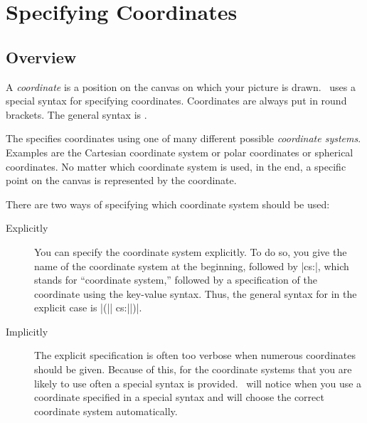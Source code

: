 %
%
%

\section{Specifying Coordinates}


\subsection{Overview}

A \emph{coordinate} is a position on the canvas on which your picture
is drawn. \tikzname\ uses a special syntax for specifying
coordinates. Coordinates are always put in round brackets. The general
syntax is
.

The  specifies coordinates using one of
many different possible \emph{coordinate systems}. Examples are the
Cartesian coordinate system or polar coordinates or spherical
coordinates. No matter which coordinate system is used, in the end, a
specific point on the canvas is represented by the coordinate.

There are two ways of specifying which coordinate system should be used:
\begin{description}
\item[Explicitly] You can specify the coordinate system explicitly. To
  do so, you give the name of the coordinate system at the beginning,
  followed by |cs:|, which stands for ``coordinate system,'' followed
  by a specification of the coordinate using the key-value
  syntax. Thus, the general syntax for 
  in the explicit case is |(|| cs:||)|.
\item[Implicitly] The explicit specification is often too verbose when
  numerous coordinates should be given. Because of this, for the
  coordinate systems that you are likely to use often a special syntax
  is provided. \tikzname\ will notice when you use a coordinate
  specified in a special syntax and will choose the correct coordinate
  system automatically.
\end{description}

